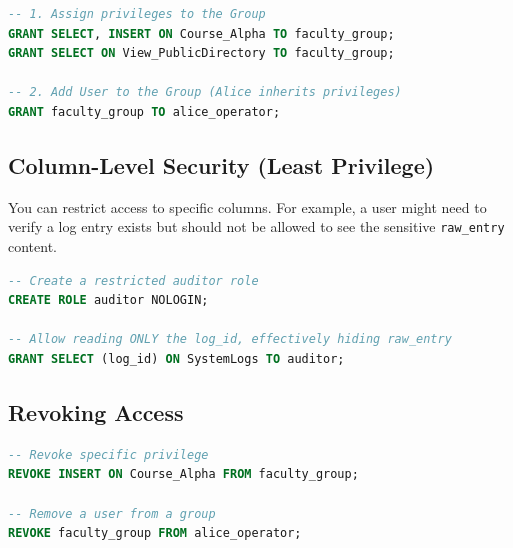 \documentclass[12pt,a4paper]{article}
\begin{document}
\begin{lstlisting}[language=SQL]
-- 1. Assign privileges to the Group
GRANT SELECT, INSERT ON Course_Alpha TO faculty_group;
GRANT SELECT ON View_PublicDirectory TO faculty_group;

-- 2. Add User to the Group (Alice inherits privileges)
GRANT faculty_group TO alice_operator;
\end{lstlisting}

\subsection{Column-Level Security (Least Privilege)}
You can restrict access to specific columns. For example, a user might need to verify a log entry exists but should not be allowed to see the sensitive \texttt{raw\_entry} content.

\begin{lstlisting}[language=SQL]
-- Create a restricted auditor role
CREATE ROLE auditor NOLOGIN;

-- Allow reading ONLY the log_id, effectively hiding raw_entry
GRANT SELECT (log_id) ON SystemLogs TO auditor;
\end{lstlisting}

\subsection{Revoking Access}
\begin{lstlisting}[language=SQL]
-- Revoke specific privilege
REVOKE INSERT ON Course_Alpha FROM faculty_group;

-- Remove a user from a group
REVOKE faculty_group FROM alice_operator;
\end{lstlisting}


\newpage
\end{document}
